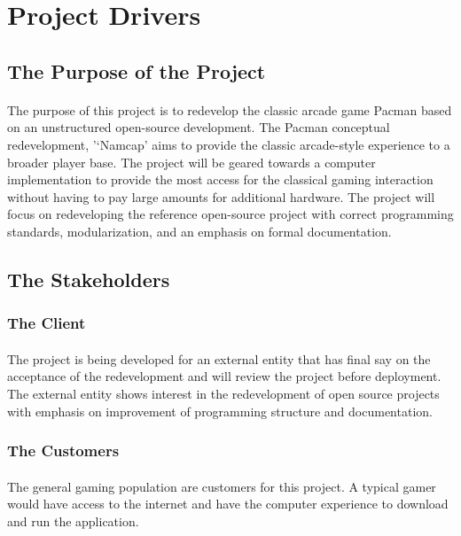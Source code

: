\documentclass[12pt, titlepage]{article}
\begin{document}
\section{Project Drivers}

\subsection{The Purpose of the Project}
\paragraph{}
The purpose of this project is to redevelop the classic arcade game Pacman based on an unstructured open-source development. The Pacman conceptual redevelopment, '‘Namcap' aims to provide the classic arcade-style experience to a broader player base. The project will be geared towards a computer implementation to provide the most access for the classical gaming interaction without having to pay large amounts for additional hardware. The project will focus on redeveloping the reference open-source project with correct programming standards, modularization, and an emphasis on formal documentation.

\subsection{The Stakeholders}

\subsubsection{The Client}
\paragraph{}
The project is being developed for an external entity that has final say on the acceptance of the redevelopment and will review the project before deployment. The external entity shows interest in the redevelopment of open source projects with emphasis on improvement of programming structure and documentation.

\subsubsection{The Customers}
\paragraph{}
The general gaming population are customers for this project. A typical gamer would have access to the internet and have the computer experience to download and run the application. 
\end{document}
